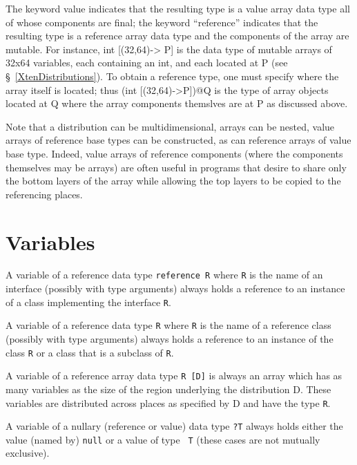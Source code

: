 
The keyword {\cf value} indicates that the resulting type is a value
array data type all of whose components are final; the keyword
``reference'' indicates that the resulting type is a reference array
data type and the components of the array are mutable.  For instance,
{\cf int [(32,64)-> P]} is the data type of mutable arrays of {\cf
32x64} variables, each containing an {\cf int}, and each located at
{\cf P} (see \S~\ref{XtenDistributions}).  To obtain a reference type,
one must specify where the array itself is located; thus {\cf (int
[(32,64)->P])@Q} is the type of array objects located at {\cf Q} where
the array components themslves are at {\cf P} as discussed above.

Note that a distribution can be multidimensional, arrays can be
nested, value arrays of reference base types can be constructed, as
can reference arrays of value base type.  Indeed, value arrays of
reference components (where the components themselves may be arrays)
are often useful in programs that desire to share only the bottom
layers of the array while allowing the top layers to be copied to the
referencing places.





\section{Variables}\label{XtenVariables}

A variable of a reference data type {\tt reference R} where {\tt R} is
the name of an interface (possibly with type arguments) always holds a
reference to an instance of a class implementing the interface {\tt R}.

A variable of a reference data type {\tt R} where {\tt R} is the name
of a reference class (possibly with type arguments) always holds a
reference to an instance of the class {\tt R} or a class that is a
subclass of {\tt R}. 

A variable of a reference array data type {\tt R [D]} is always an
array which has as many variables as the size of the region underlying
the distribution {\cf D}. These variables are distributed across
places as specified by {\cf D} and have the type {\tt R}.

A variable of a nullary (reference or value) data type {\tt ?T} always
holds either the value (named by) {\tt null} or a value of type {\tt
T} (these cases are not mutually exclusive).

